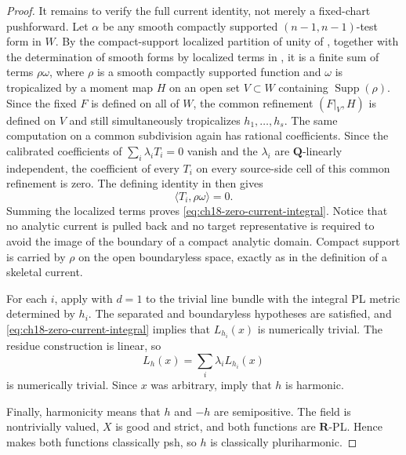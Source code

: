 \begin{proof}
It remains to verify the full current identity, not merely a fixed-chart
pushforward.  Let $\alpha$ be any smooth compactly supported
$(n-1,n-1)$-test form in $W$.  By the compact-support localized partition of
unity of \cite[Corollary~6.2.8]{CLD25}, together with the determination of
smooth forms by localized terms in \cite[Lemma~7.2.5]{CLD25}, it is a
finite sum of terms $\rho\omega$, where $\rho$ is a smooth compactly
supported function and $\omega$ is tropicalized by a moment map $H$ on an
open set $V\subset W$ containing
$\operatorname{Supp}(\rho)$.  Since the fixed $F$ is defined on all of $W$,
the common refinement $(F|_V,H)$ is defined on $V$ and still simultaneously
tropicalizes $h_1,\ldots,h_s$.  The same computation on a common subdivision
again has rational coefficients.  Since the calibrated coefficients of
$\sum_i\lambda_iT_i=0$ vanish and the $\lambda_i$ are $\mathbf Q$-linearly
independent, the coefficient of every $T_i$ on every source-side cell of
this common refinement is zero.  The defining identity in
\cite[Definition~7.5.1]{CLD25} then gives
\[
                         \langle T_i,\rho\omega\rangle=0.
\]
Summing the localized terms proves \eqref{eq:ch18-zero-current-integral}.
Notice that no analytic current is pulled back and no target representative
is required to avoid the image of the boundary of a compact analytic
domain.  Compact support is carried by $\rho$ on the open boundaryless
space, exactly as in the definition of a skeletal current.

For each $i$, apply \cite[Theorem~18.8.4]{CLD25} with $d=1$ to the trivial
line bundle with the integral PL metric determined by $h_i$.  The separated
and boundaryless hypotheses are satisfied, and
\eqref{eq:ch18-zero-current-integral} implies that $L_{h_i}(x)$ is
numerically trivial.  The residue construction is linear, so
\[
                         L_h(x)=\sum_i\lambda_iL_{h_i}(x)
\]
is numerically trivial.  Since $x$ was arbitrary,
\cite[Proposition~7.1 and Definition~7.2]{GJR26} imply that $h$ is harmonic.

Finally, harmonicity means that $h$ and $-h$ are semipositive.  The field is
nontrivially valued, $X$ is good and strict, and both functions are
$\mathbf R$-PL.  Hence \cite[Theorem~4.3]{GR25Classical} makes both functions
classically psh, so $h$ is classically pluriharmonic.
\end{proof}
